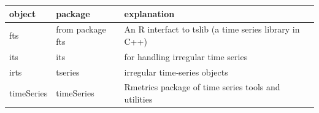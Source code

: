 \documentclass[]{book}
\begin{document}
\begin{longtable}[]{@{}lll@{}}
\toprule
\begin{minipage}[b]{0.12\columnwidth}\raggedright
object\strut
\end{minipage} & \begin{minipage}[b]{0.15\columnwidth}\raggedright
package\strut
\end{minipage} & \begin{minipage}[b]{0.64\columnwidth}\raggedright
explanation\strut
\end{minipage}\tabularnewline
\midrule
\endhead
\begin{minipage}[t]{0.12\columnwidth}\raggedright
fts\strut
\end{minipage} & \begin{minipage}[t]{0.15\columnwidth}\raggedright
from package fts\strut
\end{minipage} & \begin{minipage}[t]{0.64\columnwidth}\raggedright
An R interfact to tslib (a time series library in C++)\strut
\end{minipage}\tabularnewline
\begin{minipage}[t]{0.12\columnwidth}\raggedright
its\strut
\end{minipage} & \begin{minipage}[t]{0.15\columnwidth}\raggedright
its\strut
\end{minipage} & \begin{minipage}[t]{0.64\columnwidth}\raggedright
for handling irregular time series\strut
\end{minipage}\tabularnewline
\begin{minipage}[t]{0.12\columnwidth}\raggedright
irts\strut
\end{minipage} & \begin{minipage}[t]{0.15\columnwidth}\raggedright
tseries\strut
\end{minipage} & \begin{minipage}[t]{0.64\columnwidth}\raggedright
irregular time‐series objects\strut
\end{minipage}\tabularnewline
\begin{minipage}[t]{0.12\columnwidth}\raggedright
timeSeries\strut
\end{minipage} & \begin{minipage}[t]{0.15\columnwidth}\raggedright
timeSeries\strut
\end{minipage} & \begin{minipage}[t]{0.64\columnwidth}\raggedright
Rmetrics package of time series tools and utilities\strut

\end{minipage}
\end{longtable}
\end{document}
